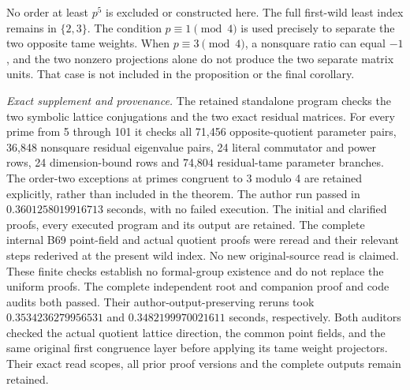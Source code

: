 \begin{remark}
\label{rem:B-RD83-scope}
No order at least \(p^5\) is excluded or constructed here.
The full first-wild least index remains in \(\{2,3\}\).
The condition \(p\equiv1\pmod4\) is used precisely to
separate the two opposite tame weights. When
\(p\equiv3\pmod4\), a nonsquare ratio can equal \(-1\),
and the two nonzero projections alone do not produce the
two separate matrix units. That case is not included in
the proposition or the final corollary.

\smallskip
\noindent\emph{Exact supplement and provenance.}
The retained standalone program
checks the two symbolic lattice conjugations and the two
exact residual matrices. For every prime from 5 through 101
it checks all 71,456 opposite-quotient parameter pairs,
36,848 nonsquare residual eigenvalue pairs, 24 literal
commutator and power rows, 24 dimension-bound rows and
74,804 residual-tame parameter branches. The order-two
exceptions at primes congruent to 3 modulo 4 are retained
explicitly, rather than included in the theorem.
The author run passed in \(0.3601258019916713\) seconds,
with no failed execution. The initial and clarified proofs,
every executed program and its output are retained. The
complete internal B69 point-field and actual quotient
proofs were reread and their relevant steps rederived
at the present wild index. No new original-source read
is claimed. These finite checks establish no formal-group
existence and do not replace the uniform proofs.
The complete independent root and companion proof and code
audits both passed. Their author-output-preserving reruns
took \(0.3534236279956531\) and
\(0.3482199970021611\) seconds, respectively. Both
auditors checked the actual quotient lattice direction,
the common point fields, and the same original first
congruence layer before applying its tame weight
projectors. Their exact read scopes, all prior proof
versions and the complete outputs remain retained.
\end{remark}

